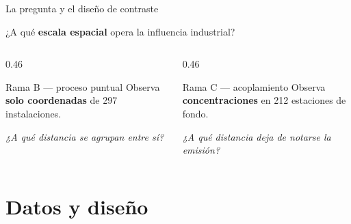 \documentclass[11pt,aspectratio=169]{beamer}
\begin{document}
\begin{frame}{La pregunta y el diseño de contraste}

\begin{center}
\large
¿A qué \textbf{escala espacial} opera la influencia industrial?
\end{center}

\vspace{4mm}
\begin{columns}[T]
\begin{column}{0.46\textwidth}
\begin{block}{Rama B --- proceso puntual}
Observa \textbf{solo coordenadas} de \num{297} instalaciones.

\vspace{2mm}
\emph{¿A qué distancia se agrupan entre sí?}
\end{block}
\end{column}
\begin{column}{0.46\textwidth}
\begin{block}{Rama C --- acoplamiento}
Observa \textbf{concentraciones} en \num{212} estaciones de fondo.

\vspace{2mm}
\emph{¿A qué distancia deja de notarse la emisión?}
\end{block}
\end{column}
\end{columns}

\vspace{4mm}
\begin{center}
\end{center}

\end{frame}

\section{Datos y diseño}
\end{document}
